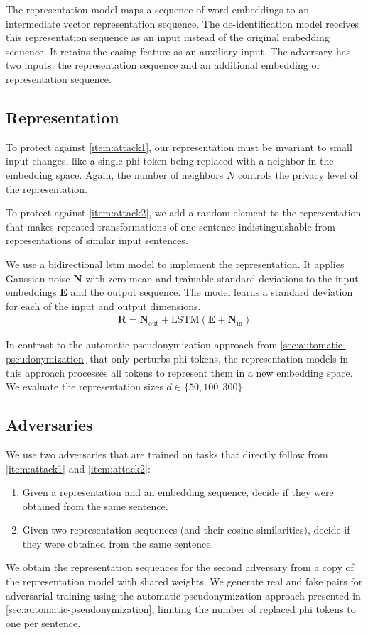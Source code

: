 %
The representation model maps a sequence of word embeddings to an intermediate vector representation sequence.
%
The de-identification model receives this representation sequence as an input instead of the original embedding sequence.
%
It retains the casing feature as an auxiliary input.
%
The adversary has two inputs: the representation sequence and an additional embedding or representation sequence.

\subsection{Representation}
%
To protect against \ref{item:attack1}, our representation must be invariant to small input changes, like a single \ac{phi} token being replaced with a neighbor in the embedding space.
%
Again, the number of neighbors $N$ controls the privacy level of the representation.

%
To protect against \ref{item:attack2}, we add a random element to the representation that makes repeated transformations of one sentence indistinguishable from representations of similar input sentences.

%
We use a bidirectional \ac{lstm} model to implement the representation.
%
It applies Gaussian noise $\bm{N}$ with zero mean and trainable standard deviations to the input embeddings $\bm{E}$ and the output sequence.
%
The model learns a standard deviation for each of the input and output dimensions.
%
\begin{align}
\bm{R} = \bm{N}_{\text{out}} + \text{LSTM}(\bm{E} + \bm{N}_{\text{in}})
\end{align}

%
In contrast to the automatic pseudonymization approach from \cref{sec:automatic-pseudonymization} that only perturbs \ac{phi} tokens, the representation models in this approach processes all tokens to represent them in a new embedding space.
%
We evaluate the representation sizes $d \in \{50, 100, 300\}$. 

\subsection{Adversaries}
%
We use two adversaries that are trained on tasks that directly follow from \ref{item:attack1} and \ref{item:attack2}:
\begin{enumerate}[label=T\arabic*.,ref=T\arabic*]
    \item Given a representation and an embedding sequence, decide if they were obtained from the same sentence.
    \item Given two representation sequences (and their cosine similarities), decide if they were obtained from the same sentence.
\end{enumerate}
%
We obtain the representation sequences for the second adversary from a copy of the representation model with shared weights.
%
We generate real and fake pairs for adversarial training using the automatic pseudonymization approach presented in \cref{sec:automatic-pseudonymization}, limiting the number of replaced \ac{phi} tokens to one per sentence.

